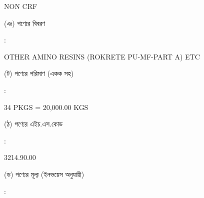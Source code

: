 \documentclass[12pt]{article}
\newcommand{\good}{OTHER AMINO RESINS (ROKRETE PU-MF-PART A) ETC}
\newcommand{\pkg}{34 PKGS = 20,000.00 KGS}
\newcommand{\crf}{NON CRF}
\newcommand{\crfdt}{}
\newcommand{\hscode}{3214.90.00}
\begin{document}
\begin{minipage}[t]{0.50\linewidth}
{\crf} \hspace{2em} {\crfdt}
\\
\end{minipage}
\begin{minipage}[t]{0.05\linewidth}
\hspace*{1em}
\end{minipage}
\begin{minipage}[t]{0.45\linewidth}
(ঞ) পণ্যের বিবরণ
\end{minipage}
\begin{minipage}[t]{0.02\linewidth}
:
\end{minipage}
\begin{minipage}[t]{0.50\linewidth}
{\good}
\\
\end{minipage}
\begin{minipage}[t]{0.05\linewidth}
\hspace*{1em}
\end{minipage}
\begin{minipage}[t]{0.45\linewidth}
(ট) পণ্যের পরিমাণ (একক সহ)
\end{minipage}
\begin{minipage}[t]{0.02\linewidth}
:
\end{minipage}
\begin{minipage}[t]{0.50\linewidth}
{\pkg}
\\
\end{minipage}
\begin{minipage}[t]{0.05\linewidth}
\hspace*{1em}
\end{minipage}
\begin{minipage}[t]{0.45\linewidth}
(ঠ) পণ্যের এইচ.এস.কোড
\end{minipage}
\begin{minipage}[t]{0.02\linewidth}
:
\end{minipage}
\begin{minipage}[t]{0.50\linewidth}
{\hscode}
\\
\end{minipage}
\begin{minipage}[t]{0.05\linewidth}
\hspace*{1em}
\end{minipage}
\begin{minipage}[t]{0.45\linewidth}
(ড) পণ্যের মূল্য (ইনভয়েস অনুযায়ী)
\end{minipage}
\begin{minipage}[t]{0.02\linewidth}
:
\end{minipage}
\end{document}
